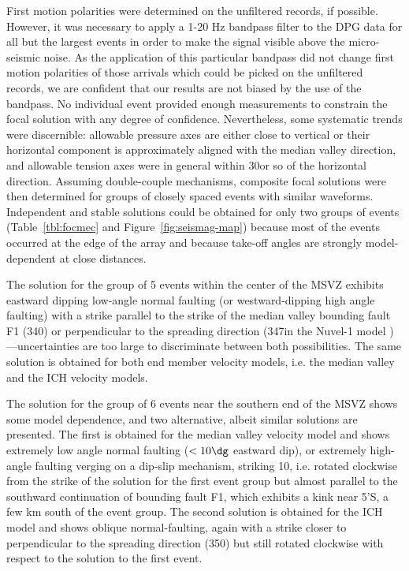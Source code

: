 \documentclass[jgr]{agu2001}
\newlength{\tw}
\begin{document}
\begin{article}
First motion polarities were determined on the unfiltered records, if
possible.  However, it was necessary to apply a 1-20 Hz bandpass
filter to the DPG data for
all but the largest events in order to make the signal visible above
the micro-seismic noise. As the application of this particular bandpass did not
change first motion polarities of those arrivals which could be picked on
the unfiltered records, we are confident that our results are not
biased by the use of the bandpass.  
No individual event provided enough measurements to constrain the
focal solution with any degree of confidence. Nevertheless, some
systematic trends were discernible:  allowable pressure
axes are either close to vertical or their horizontal component is approximately aligned with the
median valley direction, and allowable tension axes were in general within
30\dg or so of the horizontal direction.  Assuming double-couple
mechanisms, composite focal solutions
were then determined for groups of closely spaced events with similar
waveforms.   Independent and stable solutions could be obtained for
only two groups of events (Table~\ref{tbl:focmec} and Figure~\ref{fig:seismag-map})
because most of the events occurred at the edge of the array and
because take-off angles are strongly
model-dependent at close distances.

The solution for the group of 5 events within the center of the
MSVZ exhibits eastward dipping low-angle normal
faulting (or westward-dipping high angle faulting)
with a strike parallel to the strike of the median valley bounding
fault F1 (340\dg) or perpendicular to the spreading direction (347\dg in
the Nuvel-1 model \citep{demets90})---uncertainties are too large to
discriminate between both possibilities.
The same solution is obtained for both end member velocity models,
i.e. the median valley and the ICH velocity models.

The solution for the group of 6 events near the southern end of
the MSVZ shows some model dependence, and two alternative, albeit similar
solutions are presented.  The first is obtained for the median valley
velocity model and shows extremely low angle normal faulting ($<10\dg$
eastward dip), or extremely high-angle faulting verging on a dip-slip
mechanism, striking 10\dg, i.e. rotated clockwise from the strike of
the solution for the first event group but almost parallel to the southward continuation
of bounding fault F1, which exhibits a kink near 5'S,  a few km south of the
event group.  The second solution is obtained for the ICH model and
shows oblique normal-faulting, again with a strike closer to
perpendicular to the spreading direction (350\dg) but still rotated
clockwise with respect to the  solution to the first event.


\end{article}
\end{document}
